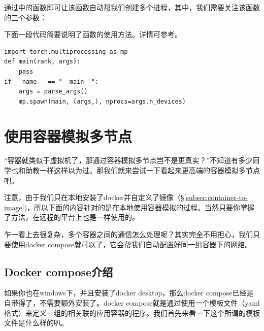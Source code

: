 通过中的函数即可让该函数自动帮我们创建多个进程，其中，我们需要关注该函数的三个参数：

下面一段代码简要说明了函数的使用方法。详情可参考。
\begin{lstlisting}
import torch.multiprocessing as mp
def main(rank, args):
    pass
if __name__ == "__main__":
    args = parse_args()
    mp.spawn(main, (args,), nprocs=args.n_devices)
\end{lstlisting}

\section{使用容器模拟多节点}

“容器就类似于虚拟机了，那通过容器模拟多节点岂不是更真实？”不知道有多少同学也和助教一样这样以为过。那我们就来尝试一下看起来更高端的容器模拟多节点吧。

注意，由于我们只在本地安装了docker并自定义了镜像（\S\ref{subsec:container-to-image})，所以下面的内容针对的是在本地使用容器模拟的过程。当然只要你掌握了方法，在远程的平台上也是一样使用的。

乍一看上去很复杂，多个容器之间的通信怎么处理呢？其实完全不用担心，我们只要使用docker compose就可以了，它会帮我们自动配置好同一组容器下的网络。

\subsection{Docker compose介绍}

如果你也在windows下，并且安装了docker desktop，那么docker compose已经是自带得了，不需要额外安装了。docker compose就是通过使用一个模板文件（yaml格式）来定义一组的相关联的应用容器的程序。我们首先来看一下这个所谓的模板文件是什么样的叭。

